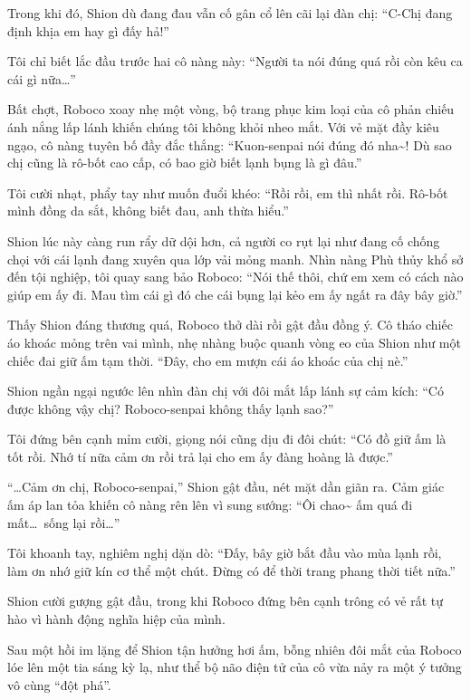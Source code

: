 \documentclass[../main.tex]{subfiles}
\begin{document}
Trong khi đó, Shion dù đang đau vẫn cố gân cổ lên cãi lại đàn chị: ``C-Chị đang định khịa em hay gì đấy hả!''

Tôi chỉ biết lắc đầu trước hai cô nàng này: ``Người ta nói đúng quá rồi còn kêu ca cái gì nữa\dots''

Bất chợt, Roboco xoay nhẹ một vòng, bộ trang phục kim loại của cô phản chiếu ánh nắng lấp lánh khiến chúng tôi không khỏi nheo mắt. Với vẻ mặt đầy kiêu ngạo, cô nàng tuyên bố đầy đắc thắng: ``Kuon-senpai nói đúng đó nha\~{}! Dù sao chị cũng là rô-bốt cao cấp, có bao giờ biết lạnh bụng là gì đâu.''

Tôi cười nhạt, phẩy tay như muốn đuổi khéo: ``Rồi rồi, em thì nhất rồi. Rô-bốt mình đồng da sắt, không biết đau, anh thừa hiểu.''

Shion lúc này càng run rẩy dữ dội hơn, cả người co rụt lại như đang cố chống chọi với cái lạnh đang xuyên qua lớp vải mỏng manh. Nhìn nàng Phù thủy khổ sở đến tội nghiệp, tôi quay sang bảo Roboco: ``Nói thế thôi, chứ em xem có cách nào giúp em ấy đi. Mau tìm cái gì đó che cái bụng lại kẻo em ấy ngất ra đây bây giờ.''

Thấy Shion đáng thương quá, Roboco thở dài rồi gật đầu đồng ý. Cô tháo chiếc áo khoác mỏng trên vai mình, nhẹ nhàng buộc quanh vòng eo của Shion như một chiếc đai giữ ấm tạm thời. ``Đây, cho em mượn cái áo khoác của chị nè.''


Shion ngần ngại ngước lên nhìn đàn chị với đôi mắt lấp lánh sự cảm kích: ``Có được không vậy chị? Roboco-senpai không thấy lạnh sao?''

Tôi đứng bên cạnh mỉm cười, giọng nói cũng dịu đi đôi chút: ``Có đồ giữ ấm là tốt rồi. Nhớ tí nữa cảm ơn rồi trả lại cho em ấy đàng hoàng là được.''

``\dots Cảm ơn chị, Roboco-senpai,'' Shion gật đầu, nét mặt dần giãn ra. Cảm giác ấm áp lan tỏa khiến cô nàng rên lên vì sung sướng: ``Ôi chao\~{} ấm quá đi mất\dots\ sống lại rồi\dots''

Tôi khoanh tay, nghiêm nghị dặn dò: ``Đấy, bây giờ bắt đầu vào mùa lạnh rồi, làm ơn nhớ giữ kín cơ thể một chút. Đừng có để thời trang phang thời tiết nữa.''

Shion cười gượng gật đầu, trong khi Roboco đứng bên cạnh trông có vẻ rất tự hào vì hành động nghĩa hiệp của mình.

\ct

Sau một hồi im lặng để Shion tận hưởng hơi ấm, bỗng nhiên đôi mắt của Roboco lóe lên một tia sáng kỳ lạ, như thể bộ não điện tử của cô vừa nảy ra một ý tưởng vô cùng ``đột phá''.
\end{document}
